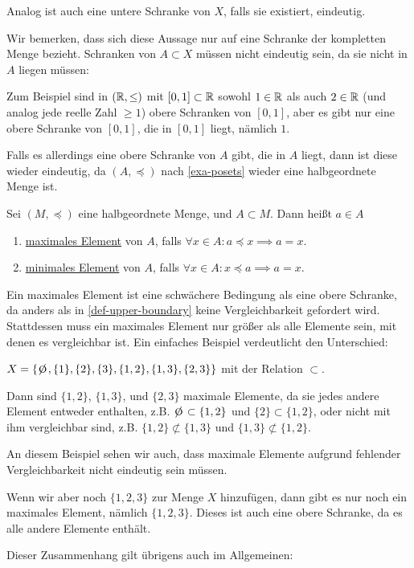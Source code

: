 Analog ist auch eine untere Schranke von $X$, falls sie existiert, eindeutig.

\begin{remark}
    \label{rem-upper-bound-unique}
    Wir bemerken, dass sich diese Aussage nur auf eine Schranke der kompletten Menge bezieht. Schranken von $A \subset X$ müssen nicht eindeutig sein, da sie nicht in $A$ liegen müssen:
    
    Zum Beispiel sind in $(\mathbb{R}, \leq)$ mit $[0, 1] \subset \mathbb{R}$ sowohl $1 \in \mathbb{R}$ als auch $2 \in \mathbb{R}$ (und analog jede reelle Zahl $\geq 1$) obere Schranken von $[0, 1]$, aber es gibt nur eine obere Schranke von $[0, 1]$, die in $[0, 1]$ liegt, nämlich $1$.

    Falls es allerdings eine obere Schranke von $A$ gibt, die in $A$ liegt, dann ist diese wieder eindeutig, da $(A, \preceq)$ nach \ref{exa-posets} wieder eine halbgeordnete Menge ist.
\end{remark}

\begin{definition}
    \label{def-maximal-element}
    Sei $(M, \preceq)$ eine halbgeordnete Menge, und $A \subset M$. Dann heißt $a \in A$
    \begin{enumerate}
        \item \underline{maximales Element} von $A$, falls $\forall x \in A: a \preceq x \implies a = x$.
        \item \underline{minimales Element} von $A$, falls $\forall x \in A: x \preceq a \implies a = x$.
    \end{enumerate}
\end{definition}

Ein maximales Element ist eine schwächere Bedingung als eine obere Schranke, da anders als in \ref{def-upper-boundary} keine Vergleichbarkeit gefordert wird. Stattdessen muss ein maximales Element nur größer als alle Elemente sein, mit denen es vergleichbar ist. Ein einfaches Beispiel verdeutlicht den Unterschied:

\begin{example}
    $X = \{ \e, \{1\}, \{2\}, \{3\}, \{1, 2\}, \{1, 3\}, \{2, 3\}\}$ mit der Relation $\subset$.

    Dann sind $\{1, 2\}$, $\{1, 3\}$, und $\{2, 3\}$ maximale Elemente, da sie jedes andere Element entweder enthalten, z.B. $\e \subset \{1, 2\}$ und $\{2\} \subset \{1, 2\}$, oder nicht mit ihm vergleichbar sind, z.B. $\{1, 2\} \not\subset \{1, 3\}$ und $\{1, 3\} \not\subset \{1, 2\}$.

    An diesem Beispiel sehen wir auch, dass maximale Elemente aufgrund fehlender Vergleichbarkeit nicht eindeutig sein müssen.

    Wenn wir aber noch $\{1, 2, 3\}$ zur Menge $X$ hinzufügen, dann gibt es nur noch ein maximales Element, nämlich $\{1, 2, 3\}$. Dieses ist auch eine obere Schranke, da es alle andere Elemente enthält.
    
    Dieser Zusammenhang gilt übrigens auch im Allgemeinen:
\end{example}

